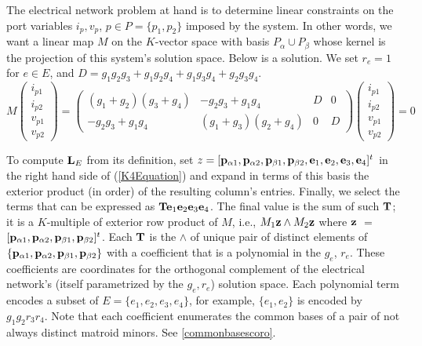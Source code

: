 The electrical network problem at hand is to determine linear constraints on the
port variables $i_p, v_p$, $p\in P = \{p_1, p_2\}$ imposed by the system.  In other words,
we want a linear map $M$ on the $K$-vector space with basis $P_\alpha \cup P_\beta$ whose kernel
is the projection of this system's solution space.
Below is a solution.
We set $r_e=1$ for $e\in E$, and $D=g_{1} g_{2} g_{3} + g_{1} g_{2} g_{4} + g_{1} g_{3} g_{4} + g_{2} g_{3} g_{4}$.
\begin{equation}\label{K4Soln}
M\left(\begin{array}{c} i_{p1} \\ i_{p2} \\ v_{p1} \\ v_{p2}
\end{array}\right) =
\left(\begin{array}{cccc}
{\left(g_{1} + g_{2}\right)} {\left(g_{3} + g_{4}\right)} & -g_{2} g_{3} + g_{1} g_{4} & D & 0 \\
-g_{2} g_{3} + g_{1} g_{4} & {\left(g_{1} + g_{3}\right)} {\left(g_{2} + g_{4}\right)} & 0 & D
\end{array}\right)
\left(\begin{array}{c} i_{p1} \\ i_{p2} \\ v_{p1} \\ v_{p2}
\end{array}\right) = 0
\end{equation}


To compute $\mathbf{L}_E$ from its definition, set 
$z=[\mathbf{p}_{\alpha 1},\mathbf{p}_{\alpha 2},\mathbf{p}_{\beta 1},\mathbf{p}_{\beta 2},
  \mathbf{e}_1,  \mathbf{e}_2,  \mathbf{e}_3,  \mathbf{e}_4]^t$
in the right hand side of (\ref{K4Equation}) 
and expand in terms of this basis
the exterior product (in order) of the resulting column's entries.
Finally, we select
the terms that can be expressed as
$\mathbf{T}\mathbf{e}_1\mathbf{e}_2\mathbf{e}_3\mathbf{e}_4$.
The final
value is the sum of such $\mathbf{T}$; it is a $K$-multiple of exterior
row product of $M$, i.e., $M_1\mathbf{z}\wedge M_2\mathbf{z}$ where
$\mathbf{z}$ $=$ 
$[\mathbf{p}_{\alpha 1},\mathbf{p}_{\alpha 2},\mathbf{p}_{\beta 1},\mathbf{p}_{\beta 2}]^t$.
Each $\mathbf{T}$ is the $\wedge$ of unique pair of distinct elements
of $\{\mathbf{p}_{\alpha 1}, \mathbf{p}_{\alpha 2}, \mathbf{p}_{\beta 1}, \mathbf{p}_{\beta 2}\}$
with a coefficient that is a polynomial in the 
$g_e$, $r_e$.  These coefficients are \Plucker coordinates
for the orthogonal complement of the electrical network's
(itself parametrized by the $g_e, r_e$) solution space.
Each polynomial
term encodes a subset of $E=\{e_1, e_2, e_3, e_4\}$, for example, $\{e_1, e_2\}$ is encoded
by $g_1g_2r_3r_4$. Note that each coefficient enumerates
the common bases of a pair of not always distinct matroid minors.  See \ref{commonbasescoro}.


